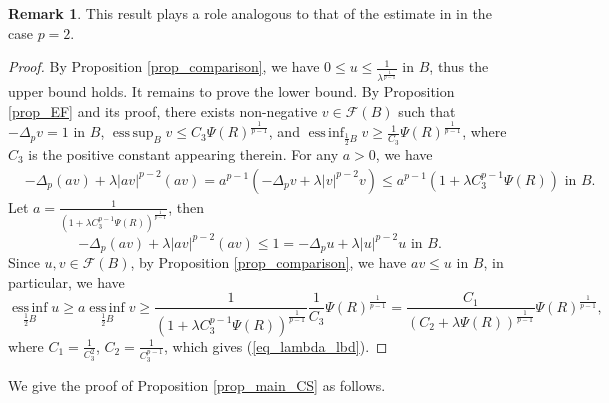 \documentclass[11pt,a4paper]{article}
\numberwithin{equation}{section}
\newcommand{\esup}{\operatorname*{ess\,sup}}
\newcommand{\einf}{\operatorname*{ess\,inf}}
\theoremstyle{plain}
\theoremstyle{definition}
\newtheorem{remark}[theorem]{Remark}
\begin{document}
\begin{remark}
This result plays a role analogous to that of the estimate in \cite[LEMMA 3.1]{GHL15} in the case $p=2$.
\end{remark}

\begin{proof}
By Proposition \ref{prop_comparison}, we have $0\le u\le \frac{1}{\lambda^{\frac{1}{p-1}}}$ in $B$, thus the upper bound holds. It remains to prove the lower bound. By Proposition \ref{prop_EF} and its proof, there exists non-negative $v\in\mathcal{F}(B)$ such that $-\Delta_pv=1$ in $B$, $\esup_Bv\le C_3\Psi(R)^{\frac{1}{p-1}}$, and $\einf_{\frac{1}{2}B}v\ge \frac{1}{C_3}\Psi(R)^{\frac{1}{p-1}}$, where $C_3$ is the positive constant appearing therein. For any $a>0$, we have
\begin{align*}
&-\Delta_p(av)+\lambda|av|^{p-2}(av)=a^{p-1}\left(-\Delta_pv+\lambda|v|^{p-2}v\right)\le a^{p-1}(1+\lambda C_3^{p-1}\Psi(R))\text{ in }B.
\end{align*}
Let $a=\frac{1}{\left(1+ \lambda C_3^{p-1}\Psi(R)\right)^{\frac{1}{p-1}}}$, then
$$-\Delta_p(av)+\lambda|av|^{p-2}(av)\le1=-\Delta_p u+\lambda|u|^{p-2}u\text{ in }B.$$
Since $u,v\in\mathcal{F}(B)$, by Proposition \ref{prop_comparison}, we have $av \le u$ in $B$, in particular, we have
$$\einf_{\frac{1}{2}B}u\ge a\einf_{\frac{1}{2}B}v\ge \frac{1}{\left(1+ \lambda C_3^{p-1}\Psi(R)\right)^{\frac{1}{p-1}}}\frac{1}{C_3}\Psi(R)^{\frac{1}{p-1}}=\frac{C_1}{\left(C_2+\lambda\Psi(R)\right)^{\frac{1}{p-1}}}\Psi(R)^{\frac{1}{p-1}},$$
where $C_1=\frac{1}{C_3^2}$, $C_2=\frac{1}{C_3^{p-1}}$, which gives (\ref{eq_lambda_lbd}).
\end{proof}

We give the proof of Proposition \ref{prop_main_CS} as follows.
\end{document}
